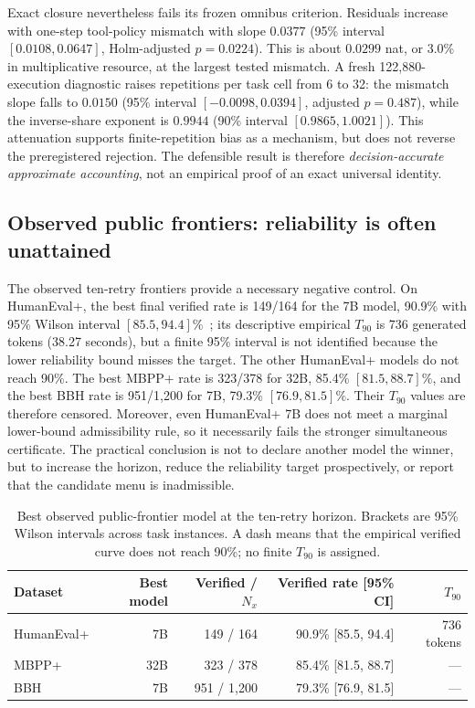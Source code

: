 \documentclass{article}
\theoremstyle{definition}
\theoremstyle{plain}
\theoremstyle{remark}
\begin{document}
Exact closure nevertheless fails its frozen omnibus criterion.  Residuals
increase with one-step tool-policy mismatch with slope \(0.0377\)
(95\% interval \([0.0108,0.0647]\), Holm-adjusted \(p=0.0224\)).  This is about
\(0.0299\) nat, or 3.0\% in multiplicative resource, at the largest tested
mismatch.  A fresh 122,880-execution diagnostic raises repetitions per task
cell from 6 to 32: the mismatch slope falls to \(0.0150\)
(95\% interval \([-0.0098,0.0394]\), adjusted \(p=0.487\)), while the
inverse-share exponent is \(0.9944\) (90\% interval \([0.9865,1.0021]\)).
This attenuation supports finite-repetition bias as a mechanism, but does not
reverse the preregistered rejection.  The defensible result is therefore
\emph{decision-accurate approximate accounting}, not an empirical proof of an
exact universal identity.

\subsection{Observed public frontiers: reliability is often unattained}

The observed ten-retry frontiers provide a necessary negative control.  On
HumanEval+, the best final verified rate is 149/164 for the 7B model,
90.9\% with 95\% Wilson interval \([85.5,94.4]\%\)~\citep{wilson1927probable};
its descriptive empirical
\(T_{90}\) is 736 generated tokens (38.27 seconds), but a finite 95\% interval
is not identified because the lower reliability bound misses the target.  The other HumanEval+
models do not reach 90\%.  The best MBPP+ rate is 323/378 for 32B,
85.4\% \([81.5,88.7]\%\), and the best BBH rate is 951/1,200 for 7B,
79.3\% \([76.9,81.5]\%\).  Their \(T_{90}\) values are therefore censored.
Moreover, even HumanEval+ 7B does not meet a marginal lower-bound admissibility
rule, so it necessarily fails the stronger simultaneous certificate.  The
practical conclusion is not to
declare another model the winner, but to increase the horizon, reduce the
reliability target prospectively, or report that the candidate menu is
inadmissible.

\begin{table}[t]
\centering
\caption{Best observed public-frontier model at the ten-retry horizon.
Brackets are 95\% Wilson intervals across task instances.  A dash means that
the empirical verified curve does not reach 90\%; no finite \(T_{90}\) is
assigned.}
\label{tab:observed-frontier}
\small
\begin{tabular}{lrrrr}
\toprule
Dataset & Best model & Verified / \(N_x\) & Verified rate [95\% CI] & \(T_{90}\) \\
\midrule
HumanEval+ & 7B  & 149 / 164   & 90.9\% [85.5, 94.4] & 736 tokens \\
MBPP+      & 32B & 323 / 378   & 85.4\% [81.5, 88.7] & --- \\
BBH        & 7B  & 951 / 1,200 & 79.3\% [76.9, 81.5] & --- \\
\bottomrule
\end{tabular}
\end{table}
\end{document}
